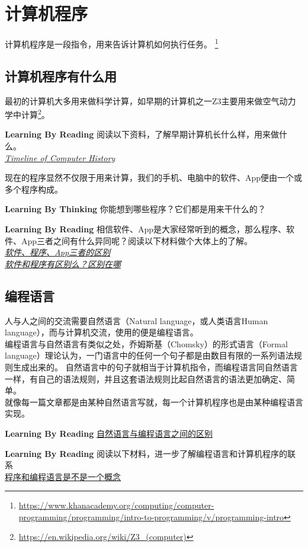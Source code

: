 \chapter{计算机程序}
计算机程序是一段指令，用来告诉计算机如何执行任务。
\footnote{\url{https://www.khanacademy.org/computing/computer-programming/programming/intro-to-programming/v/programming-intro}}
\section{计算机程序有什么用}
最初的计算机大多用来做科学计算，如早期的计算机之一Z3主要用来做空气动力学中计算\footnote{\url{https://en.wikipedia.org/wiki/Z3_(computer)}}。

\begin{paperbox}{\textbf{Learning By Reading}\startwo}
阅读以下资料，了解早期计算机长什么样，用来做什么。\\
\href{http://www.computerhistory.org/timeline/computers/}{\textit{Timeline of Computer History}}
\end{paperbox}
现在的程序显然不仅限于用来计算，我们的手机、电脑中的软件、App便由一个或多个程序构成。
\begin{paperbox}{\textbf{Learning By Thinking}\starfour}
你能想到哪些程序？它们都是用来干什么的？
\end{paperbox}
\begin{paperbox}{\textbf{Learning By Reading}\startwo}
相信软件、App是大家经常听到的概念，那么程序、软件、App三者之间有什么异同呢？阅读以下材料做个大体上的了解。\\
\href{https://teamtreehouse.com/community/the-difference-between-application-program-software}{\textit{软件、程序、App三者的区别}}\\
\href{https://www.guokr.com/question/544735/}{\textit{软件和程序有区别么？区别在哪}}
\end{paperbox}
\section{编程语言}
人与人之间的交流需要自然语言（Natural language，或人类语言Human language），而与计算机交流，使用的便是编程语言。\\
编程语言与自然语言有类似之处，乔姆斯基（Chomsky）的形式语言（Formal language）理论认为，一门语言中的任何一个句子都是由数目有限的一系列语法规则生成出来的。
自然语言中的句子就相当于计算机指令，而编程语言同自然语言一样，有自己的语法规则，并且这套语法规则比起自然语言的语法更加确定、简单。\\
就像每一篇文章都是由某种自然语言写就，每一个计算机程序也是由某种编程语言实现。
\begin{paperbox}{\textbf{Learning By Reading}\starthree}
\href{https://www.quora.com/Whats-the-difference-between-natural-languages-and-programming-languages}{自然语言与编程语言之间的区别}
\end{paperbox}
\begin{paperbox}{\textbf{Learning By Reading}\starone}
阅读以下材料，进一步了解编程语言和计算机程序的联系\\
\href{https://zhidao.baidu.com/question/96230010.html}{程序和编程语言是不是一个概念}
\end{paperbox}
